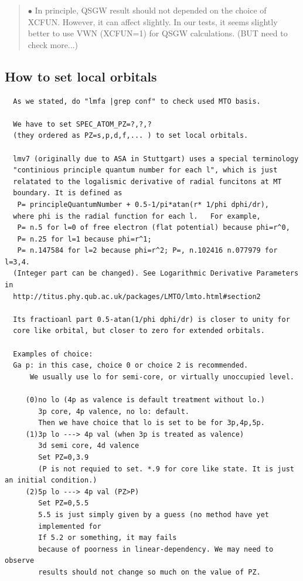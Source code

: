 {\begin{quote}
$\bullet$ In principle, QSGW result should not depended on the choice of XCFUN.
However, it can affect slightly. In our tests, it seems slightly better
to use VWN (XCFUN=1) for QSGW calculations. (BUT need to check more...)

\end{quote}


\subsection{How to set local orbitals}
\begin{verbatim}
  As we stated, do "lmfa |grep conf" to check used MTO basis. 

  We have to set SPEC_ATOM_PZ=?,?,? 
  (they ordered as PZ=s,p,d,f,... ) to set local orbitals.
  
  lmv7 (originally due to ASA in Stuttgart) uses a special terminology
  "continious principle quantum number for each l", which is just
  relatated to the logalismic derivative of radial funcitons at MT
  boundary. It is defined as
   P= principleQuantumNumber + 0.5-1/pi*atan(r* 1/phi dphi/dr),
  where phi is the radial function for each l.   For example, 
   P= n.5 for l=0 of free electron (flat potential) because phi=r^0,
   P= n.25 for l=1 because phi=r^1; 
   P= n.147584 for l=2 because phi=r^2; P=, n.102416 n.077979 for l=3,4.
  (Integer part can be changed). See Logarithmic Derivative Parameters in
  http://titus.phy.qub.ac.uk/packages/LMTO/lmto.html#section2

  Its fractioanl part 0.5-atan(1/phi dphi/dr) is closer to unity for
  core like orbital, but closer to zero for extended orbitals.

  Examples of choice:
  Ga p: in this case, choice 0 or choice 2 is recommended.
      We usually use lo for semi-core, or virtually unoccupied level.

     (0)no lo (4p as valence is default treatment without lo.)
        3p core, 4p valence, no lo: default.
        Then we have choice that lo is set to be for 3p,4p,5p.
     (1)3p lo ---> 4p val (when 3p is treated as valence)
        3d semi core, 4d valence  
        Set PZ=0,3.9 
        (P is not requied to set. *.9 for core like state. It is just an initial condition.)
     (2)5p lo ---> 4p val (PZ>P)
        Set PZ=0,5.5 
        5.5 is just simply given by a guess (no method have yet
		implemented for 
        If 5.2 or something, it may fails
        because of poorness in linear-dependency. We may need to observe
        results should not change so much on the value of PZ.


\end{verbatim}}
